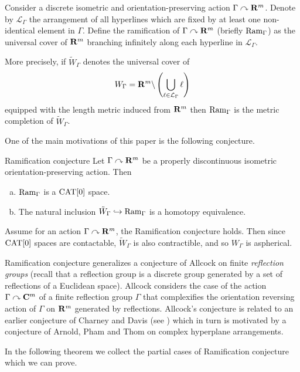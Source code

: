\documentclass{compositio}
\begin{document}
Consider a discrete isometric and orientation-preserving action $\Gamma\curvearrowright\mathbf{R}^m$.
Denote by $\mathcal{L}_\Gamma$ the arrangement of all hyperlines which are fixed by at least one non-identical element in $\Gamma$. Define the ramification of $\Gamma\curvearrowright\mathbf{R}^m$
(briefly $\mathop{\rm Ram}\nolimits_\Gamma$)
as the universal cover of $\mathbf{R}^m$  branching infinitely  along each hyperline in $\mathcal{L}_\Gamma$.

More precisely, if $\tilde W_\Gamma$ denotes the universal cover of
$$W_\Gamma=\mathbf{R}^m\backslash
\left(\bigcup_{\ell\in\mathcal{L}_\Gamma}\ell\right)$$
equipped with the length metric induced from $\mathbf{R}^m$
then $\mathop{\rm Ram}\nolimits_\Gamma$ is the metric completion of $\tilde W_\Gamma$.

One of the main motivations of this paper is the following conjecture.

\begin{thm}{Ramification conjecture}\label{mainconjecture}
Let $\Gamma\curvearrowright\mathbf{R}^m$ be a properly discontinuous isometric orientation-preserving action.
Then
\begin{enumerate}[a)]
\item $\mathop{\rm Ram}\nolimits_\Gamma$ is a $\mathrm{CAT}[0]$ space.
\item The natural inclusion
$\tilde W_\Gamma\hookrightarrow \mathop{\rm Ram}\nolimits_\Gamma$ is a homotopy equivalence.
\end{enumerate}

\end{thm}

Assume for an action $\Gamma\curvearrowright\mathbf{R}^m$, the Ramification conjecture holds. 
Then since $\mathrm{CAT}[0]$ spaces are contactable,
$\tilde W_\Gamma$ is also contractible,
and so $W_\Gamma$ is aspherical.

Ramification conjecture generalizes a conjecture of Allcock  \cite[Conjecture 1.4]{allcock} on finite \emph{reflection groups} (recall that a reflection group is a discrete group generated by a set of reflections of a Euclidean space). Allcock considers the case of the action $\Gamma\curvearrowright\mathbf{C}^m$ of a finite reflection group $\Gamma$ that complexifies the  orientation reversing action of $\Gamma$ on $\mathbf{R}^m$ generated by reflections. 
Allcock's conjecture is related to an earlier conjecture of Charney and Davis (see \cite[Conjecture 3]{charney-davis-95}) which in turn is motivated by a conjecture of Arnold, Pham and Thom on complex hyperplane  arrangements.

In the following theorem we collect the partial cases of Ramification conjecture which we can prove. 
\end{document}
